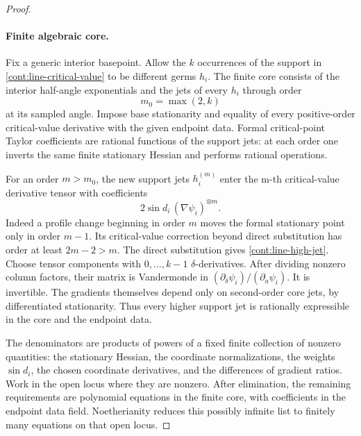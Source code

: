 \begin{proof}
\paragraph{Finite algebraic core.}
Fix a generic interior basepoint.  Allow the \(k\) occurrences
of the support in \eqref{cont:line-critical-value} to be
different germs \(h_i\).  The finite core consists of the
interior half-angle exponentials and the jets of every
\(h_i\) through order
\[
 m_0=\max(2,k)
 \]
at its sampled angle.  Impose base stationarity and equality
of every positive-order critical-value derivative with the
given endpoint data.  Formal critical-point Taylor
coefficients are rational functions of the support jets:
at each order one inverts the same finite stationary
Hessian and performs rational operations.

For an order \(m>m_0\), the new support jets \(h_i^{(m)}\)
enter the m-th critical-value derivative tensor with
coefficients
\begin{equation}
 2\sin d_i\,(\nabla\psi_i)^{\otimes m}.
 \label{cont:line-high-jet}
\end{equation}
Indeed a profile change beginning in order \(m\) moves the
formal stationary point only in order \(m-1\).  Its
critical-value correction beyond direct substitution has
order at least \(2m-2>m\).  The direct substitution gives
\eqref{cont:line-high-jet}.
Choose tensor components with \(0,\ldots,k-1\)
\(\delta\)-derivatives.  After dividing nonzero column
factors, their matrix is Vandermonde in
\((\partial_\delta\psi_i)/(\partial_a\psi_i)\).
It is invertible.  The gradients themselves depend only
on second-order core jets, by differentiated stationarity.
Thus every higher support jet is rationally expressible
in the core and the endpoint data.

The denominators are products of powers of a fixed finite
collection of nonzero quantities: the stationary Hessian,
the coordinate normalizations, the weights \(\sin d_i\),
the chosen coordinate derivatives, and the differences of
gradient ratios.  Work in the open locus where they are
nonzero.  After elimination, the remaining requirements are
polynomial equations in the finite core, with coefficients
in the endpoint data field.  Noetherianity reduces this
possibly infinite list to finitely many equations on that
open locus.


\end{proof}
